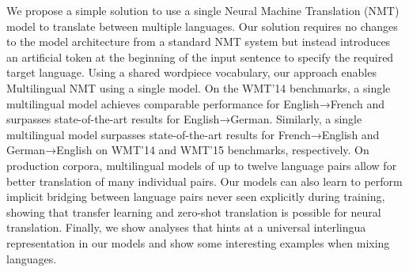 We propose a simple solution to use a single Neural Machine Translation (NMT) model to translate between multiple languages. Our solution requires no changes to the model architecture from a standard NMT system but instead introduces an artificial token at the beginning of the input sentence to specify the required target language. Using a shared wordpiece vocabulary, our approach enables Multilingual NMT using a single model. On the WMT’14 benchmarks, a single multilingual model achieves comparable performance for English→French and surpasses state-of-the-art results for English→German. Similarly, a single multilingual model surpasses state-of-the-art results for French→English and German→English on WMT’14 and WMT’15 benchmarks, respectively. On production corpora, multilingual models of up to twelve language pairs allow for better translation of many individual pairs. Our models can also learn to perform implicit bridging between language pairs never seen explicitly during training, showing that transfer learning and zero-shot translation is possible for neural translation. Finally, we show analyses that hints at a universal interlingua representation in our models and show some interesting examples when mixing languages.
